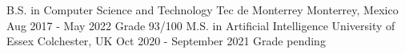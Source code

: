 \begin{cventries}
  \cventry
    {B.S. in Computer Science and Technology}
    {Tec de Monterrey}
    {Monterrey, Mexico} %
    {Aug 2017 - May 2022} %
    {Grade 93/100}
  \cventry
    {M.S. in Artificial Intelligence}
    {University of Essex}
    {Colchester, UK} %
    {Oct 2020 - September 2021} %
    {Grade pending}
\end{cventries}
